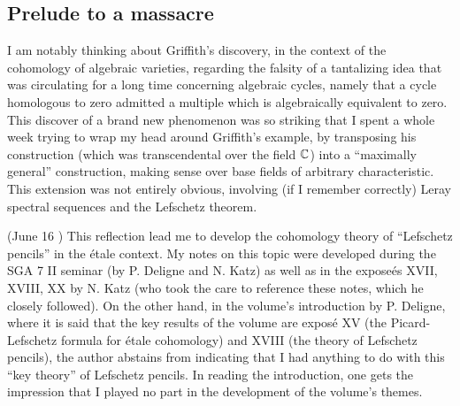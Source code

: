 \subsection{Prelude to a massacre}

\label{note:56} 
I am notably thinking about Griffith's discovery, in the context of the cohomology of
algebraic varieties, regarding the falsity 
of a tantalizing idea that 
was circulating for a long time concerning algebraic cycles, namely that a 
cycle homologous to zero admitted a multiple 
which is algebraically equivalent to zero. 
This discover of a brand new phenomenon was so striking that I spent a whole week 
trying to wrap my head around Griffith's example, by transposing his construction (which
was transcendental over the field $\mathbb{C}$) into a ``maximally general'' construction, making
sense over base fields of arbitrary characteristic. This extension was not entirely
obvious, involving (if I remember correctly) Leray spectral sequences and the Lefschetz
theorem. 

(June 16 ) This reflection lead me to develop
the cohomology theory of ``Lefschetz pencils'' in the \'etale context.
My notes on this topic were developed during the 
SGA 7 II seminar (by P. Deligne and N. Katz) as well as in the expose\'es 
XVII, XVIII, XX by N. Katz (who took the care to reference these notes,
which he closely followed).
On the other hand, in the volume's introduction by P. Deligne, where it is said that the
key results of the volume are expos\'e XV (the Picard-Lefschetz formula for \'etale
cohomology) and XVIII (the theory of Lefschetz pencils), 
the author abstains from indicating that I had anything to do with 
this ``key theory'' of Lefschetz pencils. 
In reading the introduction, one gets the impression that I played no part in the
development of the volume's themes.

